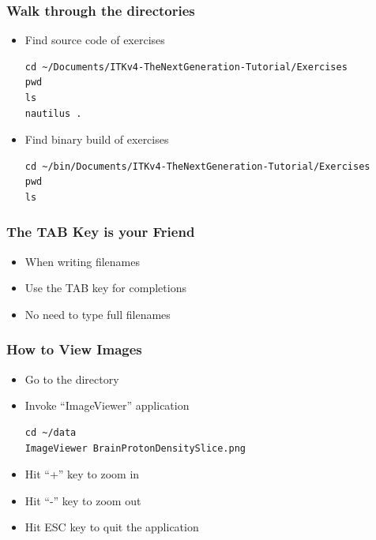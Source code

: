 {
\begin{frame}[fragile]
\frametitle{Walk through the directories}
\begin{itemize}
\item Find source code of exercises
\begin{verbatim}
cd ~/Documents/ITKv4-TheNextGeneration-Tutorial/Exercises
pwd
ls
nautilus .
\end{verbatim}
\pause
\item Find binary build of exercises
\begin{verbatim}
cd ~/bin/Documents/ITKv4-TheNextGeneration-Tutorial/Exercises
pwd
ls
\end{verbatim}
\end{itemize}
\end{frame}
}

{
\begin{frame}[fragile]
\frametitle{The TAB Key is your Friend}
\begin{itemize}
\item When writing filenames
\item Use the TAB key for completions
\item No need to type full filenames
\end{itemize}
\end{frame}
}

{
\begin{frame}[fragile]
\frametitle{How to View Images}
\begin{itemize}
\item Go to the directory
\item Invoke ``ImageViewer'' application
\begin{verbatim}
cd ~/data
ImageViewer BrainProtonDensitySlice.png
\end{verbatim}
\pause
\item Hit ``+'' key to zoom in
\pause
\item Hit ``-'' key to zoom out
\pause
\item Hit ESC key to quit the application
\end{itemize}
\end{frame}
}
